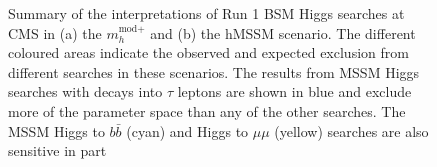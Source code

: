 \begin{figure}[h!]
\begin{center}
\end{center}
\caption{Summary of the interpretations of Run 1 BSM Higgs searches at \ac{CMS} in (a) the $m_{h}^{\text{mod+}}$ and (b) the
hMSSM scenario. The different coloured areas indicate the observed and expected exclusion from different searches in these
scenarios. The results from MSSM Higgs searches with decays into $\tau$ leptons are shown in blue and exclude more of the parameter
space than any of the other searches. The MSSM Higgs to $b\bar{b}$ (cyan) and Higgs to $\mu\mu$ (yellow) searches are also sensitive in part
}
\end{figure}
